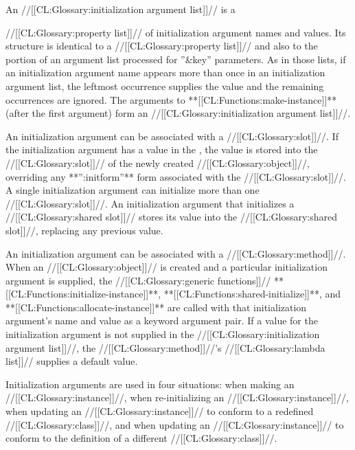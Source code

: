 An //[[CL:Glossary:initialization argument list]]// is a

//[[CL:Glossary:property list]]// of
initialization argument names and values.
Its structure is identical
to a //[[CL:Glossary:property list]]// and also 
to the portion of an argument list
processed for ''&key'' parameters.
As in those lists,
if an initialization
argument name appears more than once in an initialization argument list,
the leftmost occurrence supplies the value and the remaining occurrences
are ignored.  The arguments to **[[CL:Functions:make-instance]]** (after the first
argument) form an //[[CL:Glossary:initialization argument list]]//.







An initialization argument can be associated with a //[[CL:Glossary:slot]]//.  If
the initialization argument has a value in the , the value is stored into the //[[CL:Glossary:slot]]// of the newly
created //[[CL:Glossary:object]]//, overriding any **'':initform''** form associated
with the //[[CL:Glossary:slot]]//.  A single initialization argument can initialize
more than one //[[CL:Glossary:slot]]//.  An initialization argument that initializes
a //[[CL:Glossary:shared slot]]// stores its value into the //[[CL:Glossary:shared slot]]//,
replacing any previous value.

An initialization argument can be associated with a //[[CL:Glossary:method]]//.  When
an //[[CL:Glossary:object]]// is created and a particular initialization argument is
supplied, the //[[CL:Glossary:generic functions]]// **[[CL:Functions:initialize-instance]]**,
**[[CL:Functions:shared-initialize]]**, and **[[CL:Functions:allocate-instance]]** are called
with that initialization argument's name and value as a keyword argument
pair.  If a value for the initialization argument is not supplied in the
//[[CL:Glossary:initialization argument list]]//, the //[[CL:Glossary:method]]//'s 
//[[CL:Glossary:lambda list]]// supplies a default value.

Initialization arguments are used in four situations: when making an
//[[CL:Glossary:instance]]//, when re-initializing an //[[CL:Glossary:instance]]//, when updating
an //[[CL:Glossary:instance]]// to conform to a redefined //[[CL:Glossary:class]]//, and when
updating an //[[CL:Glossary:instance]]// to conform to the definition of a different
//[[CL:Glossary:class]]//.

